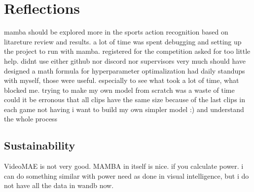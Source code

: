 \section{Reflections}
mamba should be explored more in the sports action recognition based on litareture review and results. 
a lot of time was spent debugging and setting up the project to run with mamba. 
registered for the competition
asked for too little help. didnt use either github nor discord nor supervisors very much
should have designed a math formula for hyperparameter optimalization
had daily standups with myself, those were useful. especially to see what took a lot of time, what blocked me.
trying to make my own model from scratch was a waste of time
could it be erronous that all clips have the same size because of the last clips in each game not having
i want to build my own simpler model :) and understand the whole process

\subsection{Sustainability}
VideoMAE is not very good. MAMBA in itself is nice. if you calculate power. i can do something similar with power need as done in visual intelligence, but i do not have all the data in wandb now. 